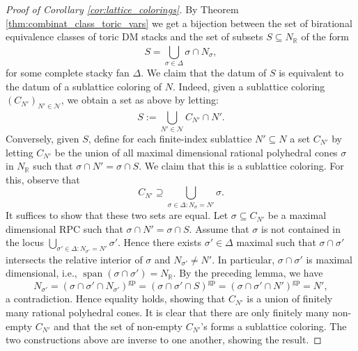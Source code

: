 \documentclass[11pt]{amsart}
\theoremstyle{definition}
\theoremstyle{remark}
\DeclareMathOperator{\Span}{span}
\def\gp{\mathrm{gp}}
\begin{document}
\begin{proof}[Proof of Corollary \ref{cor:lattice_colorings}]
	By Theorem \ref{thm:combinat_class_toric_vars}
	we get a bijection between the set of birational equivalence classes of toric
	DM stacks and the set of subsets
	$S\subseteq N_{\mathbb{R}}$ of the form
	$$S=\bigcup_{\sigma\in \Delta}^{}\sigma\cap N_{\sigma},$$
	for some complete stacky fan $\Delta$. We claim that the
	datum of $S$ is equivalent to the datum of a sublattice
	coloring of $N$. Indeed, given a sublattice coloring
	$(C_{N'})_{N'\in \mathcal{N}}$, we obtain a set as above
	by letting:
	$$S:=\bigcup_{N'\in \mathcal{N}}^{}C_{N'}\cap N'.$$
	Conversely, given $S$, define for each finite-index
	sublattice $N'\subseteq N$ a set $C_{N'}$ by letting
	$C_{N'}$ be the union of all maximal dimensional rational
	polyhedral cones $\sigma$ in $N_{\mathbb{R}}$ such that
	$\sigma\cap N'=\sigma\cap S$. We claim that this is a
	sublattice coloring. For this, observe that
	$$C_{N'}\supseteq \bigcup_{\sigma\in \Delta:N_{\sigma}=N'}\sigma.$$
	It suffices to show that these two sets are equal.
	Let $\sigma\subseteq C_{N'}$ be a maximal dimensional RPC
	such that $\sigma\cap N'=\sigma\cap S$. Assume that
	$\sigma$ is not contained in the locus $\bigcup_{\sigma'\in \Delta:N_{\sigma'}=N'}\sigma'$.
	Hence there exists $\sigma'\in \Delta$ maximal such that
	$\sigma\cap \sigma'$ intersects the relative interior of $\sigma$
	and $N_{\sigma'}\neq N'$. In particular, $\sigma\cap \sigma'$ is maximal dimensional,
	i.e., $\Span(\sigma\cap \sigma')=N_{\mathbb{R}}$. By the preceding lemma, we have
	$$N_{\sigma'}=(\sigma\cap \sigma'\cap N_{\sigma'})^{\gp}=(\sigma\cap \sigma'\cap S)^{\gp}=(\sigma\cap \sigma'\cap N')^{\gp}=N',$$
	a contradiction. Hence equality holds, showing that
	$C_{N'}$ is a union of finitely many rational polyhedral cones.
	It is clear that there are only finitely many non-empty
	$C_{N'}$ and that the set of non-empty $C_{N'}$'s forms
	a sublattice coloring. The two constructions above are inverse
	to one another, showing the result.
\end{proof}



\end{document}
